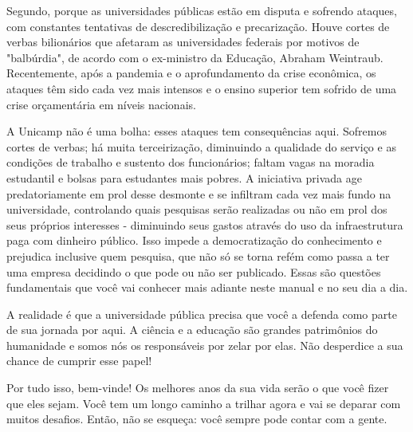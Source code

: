 Segundo, porque as universidades públicas estão em disputa e sofrendo ataques, com constantes tentativas de descredibilização e precarização. Houve cortes de verbas bilionários que afetaram as universidades federais por motivos de "balbúrdia", de acordo com o ex-ministro da Educação, Abraham Weintraub. Recentemente, após a pandemia e o
aprofundamento da crise econômica, os ataques têm sido cada vez mais intensos e o ensino superior tem sofrido de uma crise orçamentária em níveis nacionais.

A Unicamp não é uma bolha: esses ataques tem consequências aqui. Sofremos cortes de verbas; há muita terceirização, diminuindo a qualidade do serviço e as condições de trabalho e sustento dos funcionários; faltam vagas na moradia estudantil e bolsas para estudantes mais pobres. A iniciativa privada age predatoriamente em prol desse desmonte e se infiltram cada vez mais fundo na universidade, controlando quais pesquisas serão realizadas ou não em prol dos seus próprios interesses - diminuindo seus gastos através do uso da infraestrutura paga com dinheiro público. Isso impede a democratização do conhecimento e prejudica inclusive quem pesquisa, que não só se torna refém como passa a ter uma empresa decidindo o que pode ou não ser publicado. Essas são questões fundamentais que você vai conhecer mais adiante neste manual e no
seu dia a dia.

A realidade é que a universidade pública precisa que você a defenda como parte de sua jornada por aqui. A ciência e a educação são grandes patrimônios do humanidade e somos nós os responsáveis por zelar por elas. Não desperdice a sua chance de cumprir esse papel!

Por tudo isso, bem-vinde! Os melhores anos da sua vida serão o que você fizer que eles sejam. Você tem um longo caminho a trilhar agora e vai se deparar com muitos desafios. Então, não se esqueça: você sempre pode contar com a gente.